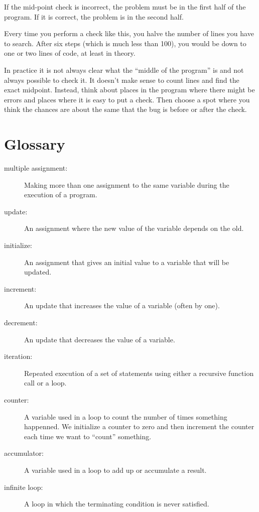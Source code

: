 \documentclass[10pt]{book}
\begin{document}
If the mid-point check is incorrect, the problem must be in the
first half of the program.  If it is correct, the problem is
in the second half.

Every time you perform a check like this, you halve the number
of lines you have to search.  After six steps (which is much
less than 100), you would be down to one or two lines of code,
at least in theory.

In practice it is not always clear what
the ``middle of the program'' is and not always possible to
check it.  It doesn't make sense to count lines and find the
exact midpoint.  Instead, think about places
in the program where there might be errors and places where it
is easy to put a check.  Then choose a spot where you
think the chances are about the same that the bug is before
or after the check.

\section{Glossary}

\begin{description}

\item[multiple assignment:] Making more than one assignment to the same
variable during the execution of a program.

\item[update:] An assignment where the new value of the variable
depends on the old.

\item[initialize:] An assignment that gives an initial value to
a variable that will be updated.

\item[increment:] An update that increases the value of a variable
(often by one).

\item[decrement:] An update that decreases the value of a variable.

\item[iteration:] Repeated execution of a set of statements using
either a recursive function call or a loop.

\item[counter:] A variable used in a loop to count the number
of times something happenned.  We initialize a counter to 
zero and then increment the counter each time we want to
``count'' something.

\item[accumulator:] A variable used in a loop to add up or
accumulate a result.

\item[infinite loop:] A loop in which the terminating condition is
never satisfied.

\end{description}
\end{document}
